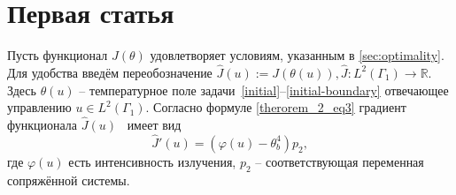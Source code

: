 


\section{Первая статья}\label{sec:ch3/sec1}
Пусть функционал $J(\theta)$ удовлетворяет условиям, указанным в \autoref{sec:optimality}.
Для удобства введём переобозначение $\hat{J}(u):=J(\theta(u)), \hat{J}:L^2(\Gamma_1) \to \mathbb{R}$.
Здесь $\theta(u)$ -- температурное поле задачи~\eqref{initial}--\eqref{initial-boundary} отвечающее
управлению $u \in L^2(\Gamma_1)$.
Согласно формуле \eqref{therorem_2_eq3} градиент функционала $\hat{J}(u)$~\cite{grenkin_13} имеет вид
\[
    \hat{J}'(u)= (\varphi(u) -\theta_b^4)p_2,
\]
где $\varphi(u)$ есть интенсивность излучения, $p_2$ -- соответствующая переменная сопряжённой системы.

